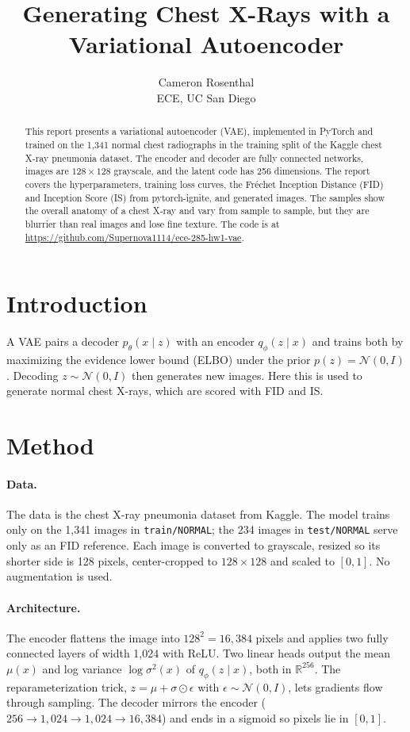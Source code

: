 \documentclass{article}
\title{Generating Chest X-Rays with a Variational Autoencoder}
\author{%
  Cameron Rosenthal \\
  ECE, UC San Diego \\
}
\begin{document}
\maketitle

\begin{abstract}
This report presents a variational autoencoder (VAE), implemented in PyTorch and trained on the 1{,}341 normal chest radiographs in the training split of the Kaggle chest X-ray pneumonia dataset. The encoder and decoder are fully connected networks, images are $128\times128$ grayscale, and the latent code has 256 dimensions. The report covers the hyperparameters, training loss curves, the Fréchet Inception Distance (FID) and Inception Score (IS) from pytorch-ignite, and generated images. The samples show the overall anatomy of a chest X-ray and vary from sample to sample, but they are blurrier than real images and lose fine texture. The code is at \url{https://github.com/Supernova1114/ece-285-hw1-vae}.
\end{abstract}

\section{Introduction}

A VAE pairs a decoder $p_\theta(x\mid z)$ with an encoder $q_\phi(z\mid x)$ and trains both by maximizing the evidence lower bound (ELBO) under the prior $p(z)=\mathcal{N}(0,I)$. Decoding $z\sim\mathcal{N}(0,I)$ then generates new images. Here this is used to generate normal chest X-rays, which are scored with FID and IS.

\section{Method}

\paragraph{Data.} The data is the chest X-ray pneumonia dataset from Kaggle. The model trains only on the 1{,}341 images in \texttt{train/NORMAL}; the 234 images in \texttt{test/NORMAL} serve only as an FID reference. Each image is converted to grayscale, resized so its shorter side is 128 pixels, center-cropped to $128\times128$ and scaled to $[0,1]$. No augmentation is used.

\paragraph{Architecture.} The encoder flattens the image into $128^2=16{,}384$ pixels and applies two fully connected layers of width 1{,}024 with ReLU. Two linear heads output the mean $\mu(x)$ and log variance $\log\sigma^2(x)$ of $q_\phi(z\mid x)$, both in $\mathbb{R}^{256}$. The reparameterization trick, $z=\mu+\sigma\odot\epsilon$ with $\epsilon\sim\mathcal{N}(0,I)$, lets gradients flow through sampling. The decoder mirrors the encoder ($256\to1{,}024\to1{,}024\to16{,}384$) and ends in a sigmoid so pixels lie in $[0,1]$.
\end{document}
